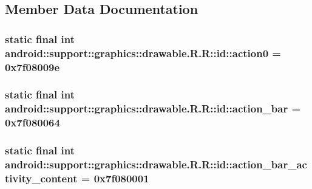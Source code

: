 \subsection{Member Data Documentation}
\hypertarget{classandroid_1_1support_1_1graphics_1_1drawable_1_1_r_1_1id_2886660faab37b05e2c8f936201e5271}{
\subsubsection[{action0}]{\setlength{\rightskip}{0pt plus 5cm}static final int android::support::graphics::drawable.R.R::id::action0 = 0x7f08009e}}
\label{classandroid_1_1support_1_1graphics_1_1drawable_1_1_r_1_1id_2886660faab37b05e2c8f936201e5271}


\hypertarget{classandroid_1_1support_1_1graphics_1_1drawable_1_1_r_1_1id_618ac727aa9e8825d020e0366722acab}{
\subsubsection[{action\_\-bar}]{\setlength{\rightskip}{0pt plus 5cm}static final int android::support::graphics::drawable.R.R::id::action\_\-bar = 0x7f080064}}
\label{classandroid_1_1support_1_1graphics_1_1drawable_1_1_r_1_1id_618ac727aa9e8825d020e0366722acab}


\hypertarget{classandroid_1_1support_1_1graphics_1_1drawable_1_1_r_1_1id_310bdb0ea743eba47e5ba695f1843b5f}{
\subsubsection[{action\_\-bar\_\-activity\_\-content}]{\setlength{\rightskip}{0pt plus 5cm}static final int android::support::graphics::drawable.R.R::id::action\_\-bar\_\-activity\_\-content = 0x7f080001}}
\label{classandroid_1_1support_1_1graphics_1_1drawable_1_1_r_1_1id_310bdb0ea743eba47e5ba695f1843b5f}


